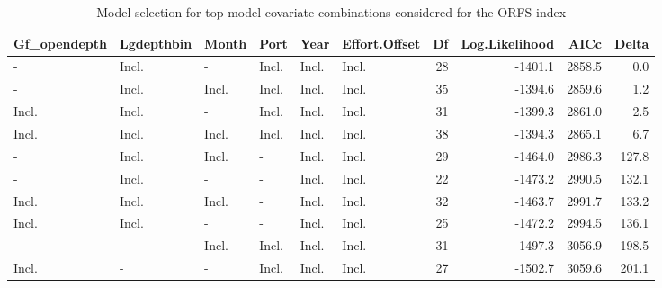 \documentclass[
  english,
]{article}
\begin{document}
\begin{longtable}{llllllrrrr}

\caption{\label{tbl-yelloweye_model_selection_ORFS}Model selection for
top model covariate combinations considered for the ORFS index}

\tabularnewline

\toprule
Gf\_opendepth & Lgdepthbin & Month & Port & Year & Effort.Offset & Df & Log.Likelihood & AICc & Delta \\ 
\midrule\addlinespace[2.5pt]
- & Incl. & - & Incl. & Incl. & Incl. & 28 & -1401.1 & 2858.5 & 0.0 \\ 
- & Incl. & Incl. & Incl. & Incl. & Incl. & 35 & -1394.6 & 2859.6 & 1.2 \\ 
Incl. & Incl. & - & Incl. & Incl. & Incl. & 31 & -1399.3 & 2861.0 & 2.5 \\ 
Incl. & Incl. & Incl. & Incl. & Incl. & Incl. & 38 & -1394.3 & 2865.1 & 6.7 \\ 
- & Incl. & Incl. & - & Incl. & Incl. & 29 & -1464.0 & 2986.3 & 127.8 \\ 
- & Incl. & - & - & Incl. & Incl. & 22 & -1473.2 & 2990.5 & 132.1 \\ 
Incl. & Incl. & Incl. & - & Incl. & Incl. & 32 & -1463.7 & 2991.7 & 133.2 \\ 
Incl. & Incl. & - & - & Incl. & Incl. & 25 & -1472.2 & 2994.5 & 136.1 \\ 
- & - & Incl. & Incl. & Incl. & Incl. & 31 & -1497.3 & 3056.9 & 198.5 \\ 
Incl. & - & - & Incl. & Incl. & Incl. & 27 & -1502.7 & 3059.6 & 201.1 \\ 
\bottomrule

\end{longtable}

\endgroup

\clearpage

\begingroup
\fontsize{9.0pt}{11.0pt}\selectfont
\end{document}
